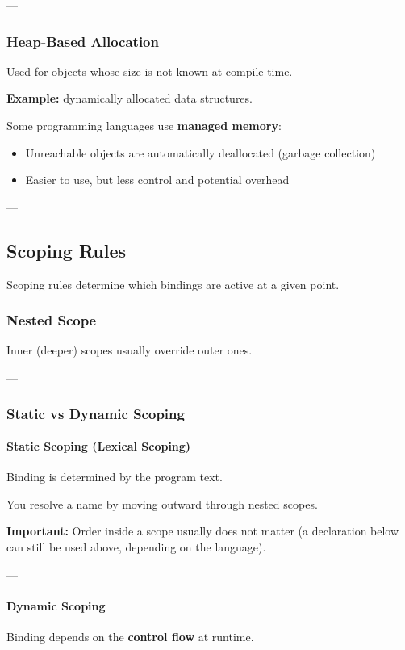 \documentclass{article}
\begin{document}
---

\subsubsection{Heap-Based Allocation}
Used for objects whose size is not known at compile time.

\textbf{Example:} dynamically allocated data structures.

Some programming languages use \textbf{managed memory}:
\begin{itemize}
  \item Unreachable objects are automatically deallocated (garbage collection)
  \item Easier to use, but less control and potential overhead
\end{itemize}

---

\subsection{Scoping Rules}
Scoping rules determine which bindings are active at a given point.

\subsubsection{Nested Scope}
Inner (deeper) scopes usually override outer ones.

---

\subsubsection{Static vs Dynamic Scoping}

\paragraph{Static Scoping (Lexical Scoping)}
Binding is determined by the program text.

You resolve a name by moving outward through nested scopes.

\textbf{Important:} Order inside a scope usually does not matter (a declaration below can still be used above, depending on the language).

---

\paragraph{Dynamic Scoping}
Binding depends on the \textbf{control flow} at runtime.
\end{document}
